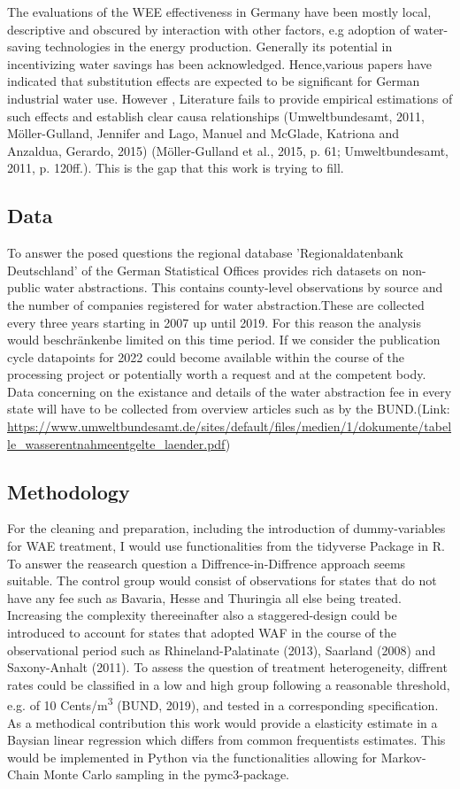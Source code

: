 \documentclass[11pt]{article}
\begin{document}
The evaluations of the WEE effectiveness in Germany have been mostly local, descriptive and obscured by interaction with other factors, e.g adoption of water-saving technologies in the energy production. Generally its potential in incentivizing water savings has been acknowledged. Hence,various papers have indicated that substitution effects are expected to be significant for German industrial water use. However , Literature fails to provide empirical estimations of such effects and establish clear causa relationships (Umweltbundesamt, 2011,  Möller-Gulland, Jennifer and Lago, Manuel and McGlade, Katriona and Anzaldua, Gerardo, 2015) (Möller-Gulland et al., 2015, p. 61; Umweltbundesamt, 2011, p. 120ff.). This is the gap that this work is trying to fill.

\subsection{Data}
\label{sec:orgb1524cd}
To answer the posed questions the regional database  'Regionaldatenbank Deutschland' of the  German Statistical Offices  provides rich datasets on non-public water abstractions. This contains county-level observations by source and the number of companies registered for water abstraction.These are collected every three years starting in 2007 up until 2019. For this reason the analysis would beschränkenbe limited on this time period.
If we consider the publication cycle datapoints for 2022 could become available within the course of the processing project or potentially worth a request and at the competent body.
Data concerning on the existance and details of the water abstraction fee in every state will have to be collected from overview articles such as by the BUND.(Link: \url{https://www.umweltbundesamt.de/sites/default/files/medien/1/dokumente/tabelle\_wasserentnahmeentgelte\_laender.pdf})

\subsection{Methodology}
\label{sec:orgf1f9abf}
For the cleaning and preparation, including the introduction of dummy-variables for WAE treatment, I would use functionalities from the tidyverse Package in R.
To answer the reasearch question a Diffrence-in-Diffrence approach seems suitable. The control group would consist of observations for states that do not have any fee such as Bavaria, Hesse and Thuringia all else being treated.
Increasing the complexity thereeinafter also a staggered-design could be introduced to account for states that adopted WAF in the course of the observational period such as Rhineland-Palatinate (2013), Saarland (2008) and Saxony-Anhalt (2011).
To assess the question of treatment heterogeneity, diffrent rates could be classified in a low and high group following a reasonable threshold, e.g. of 10 Cents/m\textsuperscript{3} (BUND, 2019), and tested in a corresponding specification.
As a methodical contribution this work would provide a elasticity estimate in a Baysian linear regression which differs from common frequentists estimates.
This would be implemented in Python via the functionalities allowing for Markov-Chain Monte Carlo sampling in the pymc3-package.  
\end{document}
